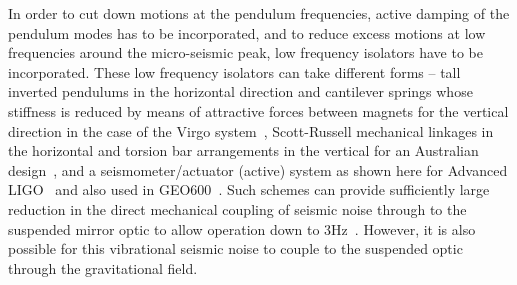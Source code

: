 \documentclass{article}
\begin{document}

In order to cut down motions at the pendulum frequencies, active damping of the
pendulum modes has to be incorporated, and to reduce excess motions at low
frequencies around the micro-seismic peak, low frequency isolators have to be
incorporated. These low frequency isolators can take different forms -- tall
inverted pendulums in the horizontal direction and cantilever springs whose
stiffness is reduced by means of attractive forces between magnets for the
vertical direction in the case of the Virgo system~\cite{Losurdo},
Scott-Russell mechanical linkages in the horizontal and torsion bar arrangements
in the vertical for an Australian design~\cite{Winterflood}, and a
seismometer/actuator (active) system as shown here for Advanced
LIGO~\cite{Abbott:2002} and also used in GEO600~\cite{Plissi2}.  Such schemes
can provide sufficiently large reduction in the direct mechanical coupling of
seismic noise through to the suspended mirror optic to allow operation down to
3Hz~\cite{Braccini:1993,ETweb}. However, it is also possible for this
vibrational seismic noise to couple to the suspended optic through the
gravitational field.

\end{document}
